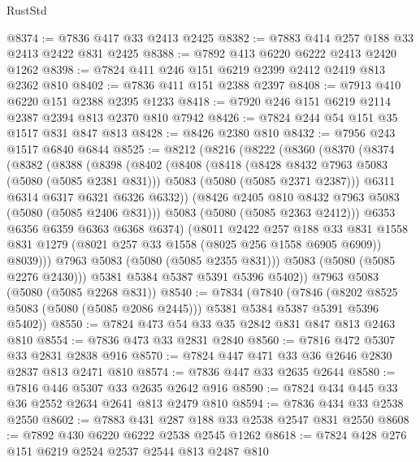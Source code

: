 \begin{lexlean}{RustStd}
\begin{coremodule}
@8374 := @7836 @417 @33 @2413 @2425
@8382 := @7883 @414 @257 @188 @33 @2413 @2422 @831 @2425
@8388 := @7892 @413 @6220 @6222 @2413 @2420 @1262
@8398 := @7824 @411 @246 @151 @6219 @2399 @2412 @2419 @813 @2362 @810
@8402 := @7836 @411 @151 @2388 @2397
@8408 := @7913 @410 @6220 @151 @2388 @2395 @1233
@8418 := @7920 @246 @151 @6219 @2114 @2387 @2394 @813 @2370 @810 @7942
@8426 := @7824 @244 @54 @151 @35 @1517 @831 @847 @813
@8428 := @8426 @2380 @810
@8432 := @7956 @243 @1517 @6840 @6844
@8525 := @8212
    (@8216
      (@8222
        (@8360
          (@8370
            (@8374
              (@8382
                (@8388
                  (@8398
                    (@8402
                      (@8408
                        (@8418
                          (@8428 @8432 @7963 @5083 (@5080 (@5085 @2381 @831)))
                          @5083
                          (@5080 (@5085 @2371 @2387)))
                        @6311
                        @6314
                        @6317
                        @6321
                        @6326
                        @6332))
                    (@8426 @2405 @810 @8432 @7963 @5083 (@5080 (@5085 @2406 @831)))
                    @5083
                    (@5080 (@5085 @2363 @2412)))
                  @6353
                  @6356
                  @6359
                  @6363
                  @6368
                  @6374)
                (@8011
                  @2422
                  @257
                  @188
                  @33
                  @831
                  @1558
                  @831
                  @1279
                  (@8021 @257 @33 @1558 (@8025 @256 @1558 @6905 @6909))
                  @8039)))
            @7963
            @5083
            (@5080 (@5085 @2355 @831)))
          @5083
          (@5080 (@5085 @2276 @2430)))
        @5381
        @5384
        @5387
        @5391
        @5396
        @5402))
    @7963
    @5083
    (@5080 (@5085 @2268 @831))
@8540 := @7834
    (@7840
      (@7846 (@8202 @8525 @5083 (@5080 (@5085 @2086 @2445))) @5381 @5384 @5387 @5391 @5396 @5402))
@8550 := @7824 @473 @54 @33 @35 @2842 @831 @847 @813 @2463 @810
@8554 := @7836 @473 @33 @2831 @2840
@8560 := @7816 @472 @5307 @33 @2831 @2838 @916
@8570 := @7824 @447 @471 @33 @36 @2646 @2830 @2837 @813 @2471 @810
@8574 := @7836 @447 @33 @2635 @2644
@8580 := @7816 @446 @5307 @33 @2635 @2642 @916
@8590 := @7824 @434 @445 @33 @36 @2552 @2634 @2641 @813 @2479 @810
@8594 := @7836 @434 @33 @2538 @2550
@8602 := @7883 @431 @287 @188 @33 @2538 @2547 @831 @2550
@8608 := @7892 @430 @6220 @6222 @2538 @2545 @1262
@8618 := @7824 @428 @276 @151 @6219 @2524 @2537 @2544 @813 @2487 @810

\end{coremodule}
\end{lexlean}
